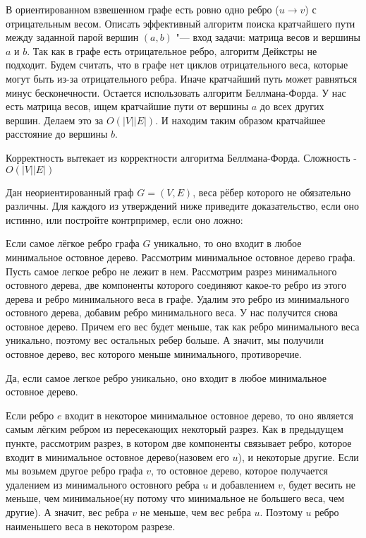 \documentclass[12pt]{extreport}
\theoremstyle{definiton}
\theoremstyle{definition}
\theoremstyle{definition}
\newcounter{problem}
\newcounter{subrproblem}
\def\prsubr{\medskip\noindent\stepcounter{subrproblem}{\bf \asbuk{subrproblem})}\;}
\begin{document}
	
	\Pr[2] В ориентированном взвешенном графе есть ровно одно ребро ($u \to v$) с отрицательным весом. Описать эффективный алгоритм поиска кратчайшего пути между заданной парой вершин $(a,b)$ "--- вход задачи: матрица весов и вершины $a$ и $b$.
    \newline
    Так как в графе есть отрицательное ребро, алгоритм Дейкстры не подходит. Будем считать, что в графе нет циклов отрицательного веса, которые могут быть из-за отрицательного ребра. Иначе кратчайший путь может равняться минус бесконечности.
    Остается использовать алгоритм Беллмана-Форда. У нас есть матрица весов, ищем кратчайшие пути от вершины $a$ до всех других вершин. Делаем это за $O(|V||E|)$. И находим таким образом кратчайшее расстояние до вершины $b$. 

    Корректность вытекает из корректности алгоритма Беллмана-Форда. Сложность - $O(|V||E|)$
		
	\Pr[3] Дан неориентированный граф $G = (V,E)$, веса рёбер которого не обязательно различны. Для каждого из утверждений ниже приведите доказательство, если оно истинно, или постройте контрпример, если оно ложно:


	\prsubr Если самое лёгкое ребро графа $G$ уникально, то оно входит в любое минимальное остовное дерево.
    \newline 
    Рассмотрим минимальное остовное дерево графа. Пусть самое легкое ребро не лежит в нем.
    Рассмотрим разрез минимального остовного дерева, две компоненты которого соединяют какое-то ребро из этого дерева и ребро минимального веса в графе. Удалим это ребро из минимального остовного дерева, добавим ребро минимального веса. У нас получится снова остовное дерево. Причем его вес будет меньше, так как ребро минимального веса уникально, поэтому вес остальных ребер больше. А значит, мы получили остовное дерево, вес которого меньше минимального, противоречие.

    Да, если самое легкое ребро уникально, оно входит в любое минимальное остовное дерево.

	\prsubr Если ребро $e$ входит в некоторое минимальное остовное дерево, то оно является самым лёгким ребром из пересекающих некоторый разрез.
    \newline
    Как в предыдущем пункте, рассмотрим разрез, в котором две компоненты связывает ребро, которое входит в минимальное остовное дерево(назовем его $u$), и некоторые другие. Если мы возьмем другое ребро графа $v$, то остовное дерево, которое получается удалением из минимального остовного ребра $u$ и добавлением $v$, будет весить не меньше, чем минимальное(ну потому что минимальное не большего веса, чем другие). А значит, вес ребра $v$ не меньше, чем вес ребра $u$. Поэтому $u$ ребро наименьшего веса в некотором разрезе.
\end{document}
